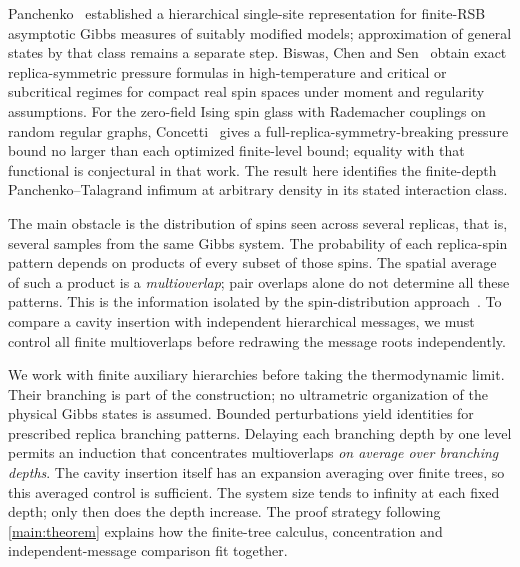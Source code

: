 Panchenko~\cite[Theorem~2]{Pan16} established a hierarchical
single-site representation for finite-RSB asymptotic Gibbs measures of
suitably modified models; approximation of general states by that class
remains a separate step. Biswas, Chen and
Sen~\cite[Theorem~1.1 and Proposition~1.4]{BCS25} obtain exact
replica-symmetric pressure formulas in high-temperature and critical or
subcritical regimes for compact real spin spaces under moment and regularity
assumptions. For the zero-field Ising spin glass with Rademacher couplings
on random regular graphs, Concetti~\cite[Theorem~1.3]{Concetti25}
gives a full-replica-symmetry-breaking pressure bound no larger than each
optimized finite-level bound; equality with that functional is
conjectural in that work. The result here
identifies the finite-depth Panchenko--Talagrand infimum at arbitrary
density in its stated interaction class.

The main obstacle is the distribution of spins seen across several
replicas, that is, several samples from the same Gibbs system. The
probability of each replica-spin pattern depends on products of every
subset of those spins. The spatial average of such a product is a
\emph{multioverlap}; pair overlaps alone do not determine all these
patterns. This is the information isolated by the spin-distribution
approach~\cite{Pan13}. To compare a cavity insertion with independent
hierarchical messages, we must control all finite multioverlaps before
redrawing the message roots independently.

We work with finite auxiliary hierarchies before taking the
thermodynamic limit. Their branching is part of the construction;
no ultrametric organization of the physical Gibbs states is assumed.
Bounded perturbations yield identities for
prescribed replica branching patterns. Delaying each branching depth
by one level permits an induction that concentrates multioverlaps
\emph{on average over branching depths}. The cavity insertion itself
has an expansion averaging over finite trees, so this averaged control
is sufficient. The system size tends to infinity at each fixed depth;
only then does the depth increase. The proof strategy following
\cref{main:theorem} explains how the finite-tree calculus, concentration
and independent-message comparison fit together.
